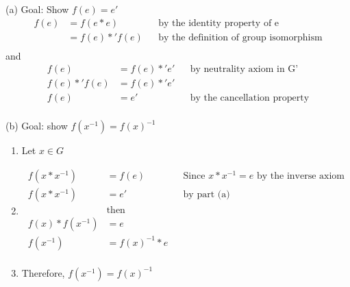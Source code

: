 
(a)
Goal: Show $f(e) = e'$
\begin{align*}
  f(e) &= f(e * e)      & &\text{by the identity property of e} \\
       &= f(e) *' f(e)  & &\text{by the definition of group isomorphism} \\
\end{align*}
and
\begin{align*}
  f(e) &= f(e) *' e'    & &\text{by neutrality axiom in G'} \\
  f(e) *' f(e) &= f(e) *' e' \\
  f(e) &= e'            & &\text{by the cancellation property} \\
\end{align*}

(b)
Goal: show $f(x^{-1}) = f(x)^{-1}$
\begin{enumerate}[nosep]
\item[] Let $x \in G$
\item[] \begin{align*}
  f(x * x^{-1}) &= f(e) & &\text{Since $x * x^{-1} = e$ by the inverse axiom} \\
  f(x * x^{-1}) &= e'   & &\text{by part (a)} \\
  &\text{then} \\
  f(x) * f(x^{-1}) &= e \\
  f(x^{-1}) &= f(x)^{-1} * e \\
\end{align*}
\item[] Therefore, $f(x^{-1}) = f(x)^{-1}$
\end{enumerate}

